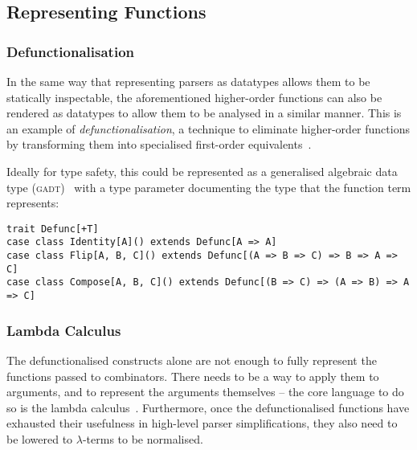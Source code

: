 \documentclass[../../main.tex]{subfiles}
\begin{document}
\subsection{Representing Functions}
\subsubsection{Defunctionalisation}
In the same way that representing parsers as datatypes allows them to be statically inspectable, the aforementioned higher-order functions can also be rendered as datatypes to allow them to be analysed in a similar manner.
This is an example of \emph{defunctionalisation}, a technique to eliminate higher-order functions by transforming them into specialised first-order equivalents~\cite{reynolds_defunc_1972,danvy_defunctionalization_2001}.

Ideally for type safety, this could be represented as a generalised algebraic data type (\textsc{gadt})~\cite{cheney_gadt_2003} with a type parameter documenting the type that the function term represents:
\begin{verbatim}
trait Defunc[+T]
case class Identity[A]() extends Defunc[A => A]
case class Flip[A, B, C]() extends Defunc[(A => B => C) => B => A => C]
case class Compose[A, B, C]() extends Defunc[(B => C) => (A => B) => A => C]
\end{verbatim}


\subsubsection{Lambda Calculus}
The defunctionalised constructs alone are not enough to fully represent the functions passed to combinators.
There needs to be a way to apply them to arguments, and to represent the arguments themselves -- the core language to do so is the lambda calculus~\cite{church_lambda_1936}.
Furthermore, once the defunctionalised functions have exhausted their usefulness in high-level parser simplifications, they also need to be lowered to $\lambda$-terms to be normalised.

\end{document}
